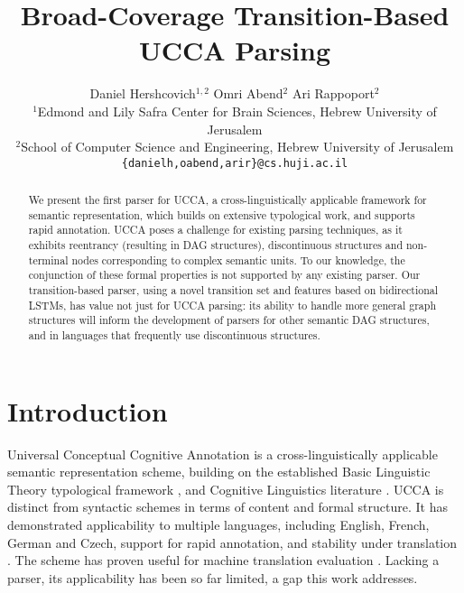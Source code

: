 \documentclass[11pt,a4paper]{article}
\title{Broad-Coverage Transition-Based UCCA Parsing}
\author{Daniel Hershcovich$^{1,2}$ \And Omri Abend$^2$ \And Ari Rappoport$^2$ \\
  $^1$Edmond and Lily Safra Center for Brain Sciences, Hebrew University of Jerusalem \\
  $^2$School of Computer Science and Engineering, Hebrew University of Jerusalem \\
  \texttt{\{danielh,oabend,arir\}@cs.huji.ac.il}
}
\date{}
\begin{document}
\maketitle

\begin{abstract}
  We present the first parser for UCCA, a
  cross-linguistically applicable framework for semantic
  representation, which builds on extensive
  typological work, and supports rapid annotation.
  UCCA poses a challenge for existing parsing techniques,
  as it exhibits reentrancy (resulting in DAG structures),
  discontinuous structures and non-terminal nodes corresponding
  to complex semantic units. To our knowledge, the conjunction
  of these formal properties is not supported by any existing parser.
  Our transition-based parser, using a novel transition set
  and features based on bidirectional LSTMs,
  has value not just for UCCA parsing:
  its ability to handle more general graph structures will inform
  the development of parsers for other semantic DAG structures, 
  and in languages that frequently use discontinuous structures.
\end{abstract}


\section{Introduction}\label{sec:introduction}

Universal Conceptual Cognitive Annotation \cite[UCCA,][]{abend2013universal}
is a cross-linguistically applicable semantic representation scheme,
building on the established Basic Linguistic Theory typological framework
\cite{Dixon:10b,Dixon:10a,Dixon:12}, and Cognitive
Linguistics literature \cite{croft2004cognitive}.
UCCA is distinct from syntactic
schemes in terms of content and formal structure.
It has demonstrated applicability to multiple languages, including
English, French, German and Czech, support for rapid annotation,
and stability under translation \cite{sulem2015conceptual}.
The scheme has proven useful for machine translation evaluation \cite{birch2016hume}.
Lacking a parser, its applicability has been so far limited,
a gap this work addresses.
\end{document}
